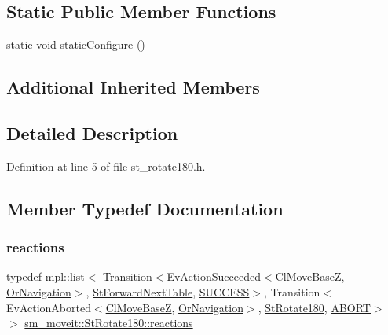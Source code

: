 \subsection*{Static Public Member Functions}
\begin{DoxyCompactItemize}
\item 
static void \hyperlink{structsm__moveit_1_1StRotate180_a7ce91eeeb1a8740e1a6f797a41dc940a}{static\+Configure} ()
\end{DoxyCompactItemize}
\subsection*{Additional Inherited Members}


\subsection{Detailed Description}


Definition at line 5 of file st\+\_\+rotate180.\+h.



\subsection{Member Typedef Documentation}
\mbox{\label{structsm__moveit_1_1StRotate180_a1f3d4ae503a581dfffd91742b9c77610}} 
\subsubsection{\texorpdfstring{reactions}{reactions}}
{\footnotesize\ttfamily typedef mpl\+::list$<$ Transition$<$Ev\+Action\+Succeeded$<$\hyperlink{classcl__move__base__z_1_1ClMoveBaseZ}{Cl\+Move\+BaseZ}, \hyperlink{classsm__moveit_1_1OrNavigation}{Or\+Navigation}$>$, \hyperlink{structsm__moveit_1_1StForwardNextTable}{St\+Forward\+Next\+Table}, \hyperlink{classSUCCESS}{S\+U\+C\+C\+E\+SS}$>$, Transition$<$Ev\+Action\+Aborted$<$\hyperlink{classcl__move__base__z_1_1ClMoveBaseZ}{Cl\+Move\+BaseZ}, \hyperlink{classsm__moveit_1_1OrNavigation}{Or\+Navigation}$>$, \hyperlink{structsm__moveit_1_1StRotate180}{St\+Rotate180}, \hyperlink{classABORT}{A\+B\+O\+RT}$>$ $>$ \hyperlink{structsm__moveit_1_1StRotate180_a1f3d4ae503a581dfffd91742b9c77610}{sm\+\_\+moveit\+::\+St\+Rotate180\+::reactions}}



